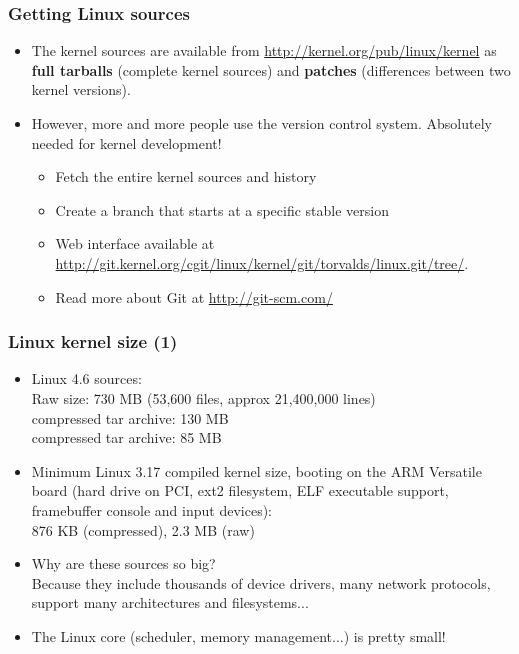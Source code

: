 \begin{frame}
  \frametitle{Getting Linux sources}
  \begin{itemize}

  \item The kernel sources are available from
    \url{http://kernel.org/pub/linux/kernel} as {\bf full tarballs}
    (complete kernel sources) and {\bf patches} (differences between
    two kernel versions).
  \item However, more and more people use the  version
    control system. Absolutely needed for kernel development!
    \begin{itemize}
    \item Fetch the entire kernel sources and history\\
    \item Create a branch that starts at a specific stable version\\
    \item Web interface available at
      \url{http://git.kernel.org/cgit/linux/kernel/git/torvalds/linux.git/tree/}.
    \item Read more about Git at \url{http://git-scm.com/}
    \end{itemize}
  \end{itemize}
\end{frame}

\begin{frame}
  \frametitle{Linux kernel size (1)}
  \begin{itemize}
  \item Linux 4.6 sources:\\
    Raw size: 730 MB (53,600 files, approx 21,400,000 lines)\\
     compressed tar archive: 130 MB\\
     compressed tar archive: 85 MB
  \item Minimum Linux 3.17 compiled kernel size,
        booting on the ARM Versatile board (hard drive on PCI, ext2
        filesystem, ELF executable support, framebuffer console and input devices):\\
    	876 KB (compressed), 2.3 MB (raw)
  \item Why are these sources so big?\\
    Because they include thousands of device drivers, many network
    protocols, support many architectures and filesystems...
  \item The Linux core (scheduler, memory management...) is pretty
    small!
  \end{itemize}
\end{frame}

